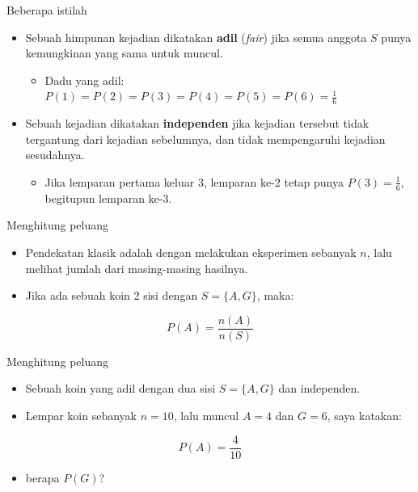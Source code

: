 \documentclass[
  ignorenonframetext,
]{beamer}
\providecommand{\tightlist}{%
  \setlength{\itemsep}{0pt}\setlength{\parskip}{0pt}}\usepackage{longtable,booktabs,array}
\begin{document}
\begin{frame}{Beberapa istilah}
\label{beberapa-istilah}
\begin{itemize}
\item
  Sebuah himpunan kejadian dikatakan \textbf{adil} (\emph{fair}) jika
  semua anggota \(S\) punya kemungkinan yang sama untuk muncul.

  \begin{itemize}
  \tightlist
  \item
    Dadu yang adil: \(P(1)=P(2)=P(3)=P(4)=P(5)=P(6)=\frac{1}{6}\)
  \end{itemize}
\item
  Sebuah kejadian dikatakan \textbf{independen} jika kejadian tersebut
  tidak tergantung dari kejadian sebelumnya, dan tidak mempengaruhi
  kejadian sesudahnya.

  \begin{itemize}
  \tightlist
  \item
    Jika lemparan pertama keluar 3, lemparan ke-2 tetap punya
    \(P(3)=\frac{1}{6}\), begitupun lemparan ke-3.
  \end{itemize}
\end{itemize}
\end{frame}

\begin{frame}{Menghitung peluang}
\label{menghitung-peluang}
\begin{itemize}
\item
  Pendekatan klasik adalah dengan melakukan eksperimen sebanyak \(n\),
  lalu melihat jumlah dari masing-masing hasilnya.
\item
  Jika ada sebuah koin 2 sisi dengan \(S=\{A,G\}\), maka:
\end{itemize}

\[
P(A)=\frac{n(A)}{n(S)}
\]
\end{frame}

\begin{frame}{Menghitung peluang}
\label{menghitung-peluang-1}
\begin{itemize}
\item
  Sebuah koin yang adil dengan dua sisi \(S=\{A,G\}\) dan independen.
\item
  Lempar koin sebanyak \(n=10\), lalu muncul \(A=4\) dan \(G=6\), saya
  katakan:
\end{itemize}

\[
P(A)=\frac{4}{10}
\]

\begin{itemize}
\tightlist
\item
  berapa \(P(G)\)?
\end{itemize}
\end{frame}
\end{document}
